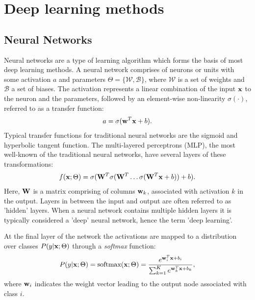 \documentclass[final,a4paper,12pt,english]{UnicaPhdThesis3}
\begin{document}
\section{Deep learning methods}
\label{sec:neuralnets}

\subsection{Neural Networks}
Neural networks are a type of learning algorithm which forms the basis of most deep learning methods. A neural network comprises of neurons or units with some activation $a$ and parameters $\Theta = \{\mathcal{W}, \mathcal{B}\}$, where $\mathcal{W}$ is a set of weights and $\mathcal{B}$ a set of biases. The activation represents a linear combination of the input ${\bf x}$ to the neuron and the parameters, followed by an element-wise non-linearity $\sigma(\cdot)$, referred to as a transfer function: 
\begin{equation}
a = \sigma({\bf w}^{T}{\bf x} + b).
\end{equation}
Typical transfer functions for traditional neural networks are the sigmoid and hyperbolic tangent function.  The multi-layered perceptrons (MLP), the most well-known of the traditional neural networks, have several layers of these transformations:
\begin{equation}
f({\bf x}; \Theta) = \sigma( {\bf W}^{T}\sigma({\bf W}^{T} \ldots \sigma({\bf W}^{T} {\bf x} + b)  ) + b).
\end{equation}
Here, ${\bf W}$ is a matrix comprising of columns ${\bf w}_{k}$, associated with activation $k$ in the output. Layers in between the input and output are often referred to as 'hidden' layers. When a neural network contains multiple hidden layers it is typically considered a 'deep' neural network, hence the term 'deep learning'.

At the final layer of the network the activations are mapped to a distribution over classes $P(y | {\bf x}; \Theta)$ through a {\it softmax} function:
\begin{equation}
P(y | {\bf x}; \Theta) = \text{softmax}({\bf x}; \Theta) = \frac{e^{{\bf w}_{i}^{T}{\bf x} + b_{i}}}{\sum^{K}_{k = 1} e^{{\bf w}_{k}^{T}{\bf x} + b_{k}}},
\end{equation}
where ${\bf w}_{i}$ indicates the weight vector leading to the output node associated with class $i$. 
\end{document}
